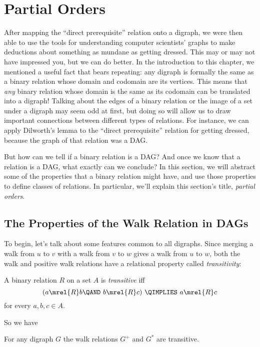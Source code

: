 \section{Partial Orders}\label{partial_order_sec}

After mapping the ``direct prerequisite'' relation onto a digraph, we
were then able to use the tools for understanding computer scientists'
graphs to make deductions about something as mundane as getting
dressed.  This may or may not have impressed you, but we can do
better.  In the introduction to this chapter, we mentioned a useful
fact that bears repeating: any digraph is formally the same as a
binary relation whose domain and codomain are its vertices.  This
means that \emph{any} binary relation whose domain is the same as its
codomain can be translated into a digraph!  Talking about the edges of
a binary relation or the image of a set under a digraph may seem odd
at first, but doing so will allow us to draw important connections
between different types of relations.  For instance, we can apply
Dilworth's lemma to the ``direct prerequisite'' relation for getting
dressed, because the graph of that relation was a DAG.

But how can we tell if a binary relation is a DAG?  And once we know
that a relation is a DAG, what exactly can we conclude?  In this
section, we will abstract some of the properties that a binary
relation might have, and use those properties to define classes of
relations.  In particular, we'll explain this section's title,
\emph{partial orders}.

\subsection{The Properties of the Walk Relation in DAGs}

To begin, let's talk about some features common to all digraphs.
Since merging a walk from $u$ to $v$ with a walk from $v$ to $w$ gives
a walk from $u$ to $w$, both the walk and positive walk%
relations have a relational property%
called \emph{transitivity}:

\begin{definition}
A binary relation $R$ on a set $A$ is
\emph{transitive}%
 iff
\[
(a \mrel{R}  b \QAND\ b \mrel{R}  c)\ \QIMPLIES\  a \mrel{R}  c
\]
\quad for every $a,b,c\in A$.
\end{definition}
So we have
\begin{lemma}
For any digraph $G$ the walk relations $G^+$ and $G^*$ are transitive.
\end{lemma}

